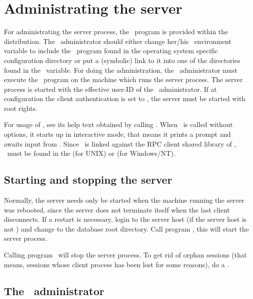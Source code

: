 \section{Administrating the server}

For administrating the server process, the \ program
is provided within the distribution. The \plob\ administrator should
either change her/his \ environment variable to include the
\ program found in the operating system specific
configuration directory
 or put a (symbolic) link to it
into one of the directories found in the \ variable. For
doing the administration, the \plob\ administrator must execute the
\ program on the machine which runs the server
process. The server process is started with the effective user-ID of
the \plob\ administrator. If at configuration the client
authentication is set to , the server must be
started with root rights.

For usage of , see its help text obtained by calling
. When \ is called without
options, it starts up in interactive mode, that means it prints a
prompt and awaits input from . Since \ is
linked against the RPC client shared library of \plobwoexcl,
\ must be found in the
 (for UNIX) or  (for
Windows/NT).

\subsection{Starting and stopping the server}

Normally, the server needs only be started when the machine running
the server was rebooted, since the server does not terminate itself
when the last client disconnects.  If a restart is necessary, login to
the server host (if the server host is not ) and
change to the database root directory. Call program , this will start the server process.

Calling program \ will stop the server
process. To get rid of orphan sessions (that means, sessions whose
client process has been lost for some reasons), do a .

\subsection[The administrator]{The \protect\plob\ administrator}

